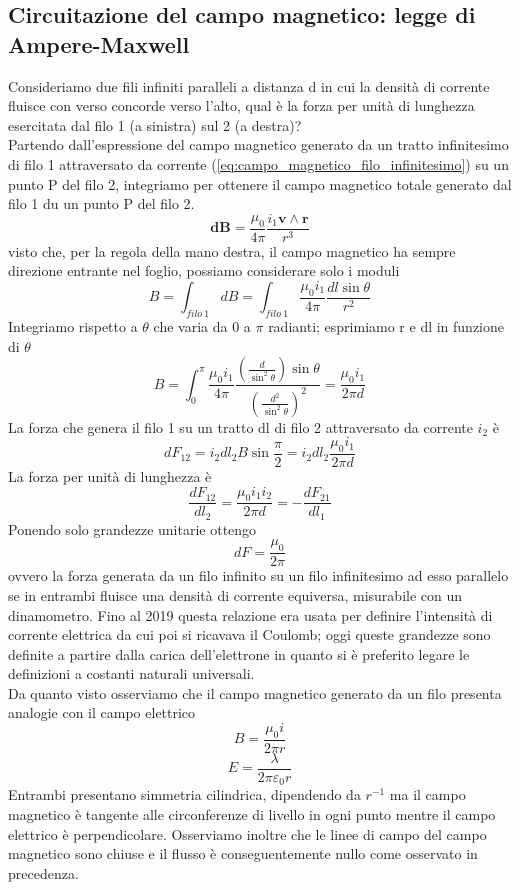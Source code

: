 \documentclass[
10pt, %
a4paper, %
oneside, %
headinclude,footinclude, %
BCOR5mm, %
]{scrartcl}
\begin{document}
\subsection{Circuitazione del campo magnetico: legge di Ampere-Maxwell}
Consideriamo due fili infiniti paralleli a distanza d in cui la densità di corrente fluisce con verso concorde verso l'alto, qual è la forza per unità di lunghezza esercitata dal filo 1 (a sinistra) sul 2 (a destra)? \\
Partendo dall'espressione del campo magnetico generato da un tratto infinitesimo di filo 1 attraversato da corrente (\ref{eq:campo_magnetico_filo_infinitesimo}) su un punto P del filo 2, integriamo per ottenere il campo magnetico totale generato dal filo 1 du un punto P del filo 2. 
\[\mathbf{dB} = \frac{\mu_0}{4\pi}\frac{i_1\mathbf{v}\wedge\mathbf{r}}{r^3} \]
visto che, per la regola della mano destra, il campo magnetico ha sempre direzione entrante nel foglio, possiamo considerare solo i moduli
\[B=\int_{filo\ 1}dB= \int_{filo\ 1}\frac{\mu_0 i_1 }{4\pi}\frac{dl \sin\theta}{r^2}\]
Integriamo rispetto a $\theta$ che varia da 0 a $\pi$ radianti; esprimiamo r e dl in funzione di $\theta$
\[B = \int_{0}^{\pi}\frac{\mu_0 i_1 }{4\pi}\frac{\left(\frac{d}{\sin^2\theta}\right) \sin\theta}{\left(\frac{d^2}{\sin^2\theta}\right)^2}= \frac{\mu_0 i_1}{2\pi d}\]
La forza che genera il filo 1 su un tratto dl di filo 2 attraversato da corrente \(i_2\) è 
\[dF_{12} = i_2dl_2 B\sin\frac{\pi}{2}=i_2dl_2 \frac{\mu_0 i_1}{2\pi d}\]
La forza per unità di lunghezza è 
\[\frac{dF_{12}}{dl_2}= \frac{\mu_0 i_1i_2}{2\pi d}=-\frac{dF_{21}}{dl_1}\]
Ponendo solo grandezze unitarie ottengo
\[dF = \frac{\mu_0}{2\pi}\]
ovvero la forza generata da un filo infinito su un filo infinitesimo ad esso parallelo se in entrambi fluisce una densità di corrente equiversa, misurabile con un dinamometro. Fino al 2019 questa relazione era usata per definire l'intensità di corrente elettrica da cui poi si ricavava il Coulomb; oggi queste grandezze sono definite a partire dalla carica dell'elettrone in quanto si è preferito legare le definizioni a costanti naturali universali.\\
Da quanto visto osserviamo che il campo magnetico generato da un filo presenta analogie con il campo elettrico
\[B = \frac{\mu_0 i}{2\pi r}\]
\[E = \frac{\lambda}{2\pi \varepsilon_0 r}\]
Entrambi presentano simmetria cilindrica, dipendendo da \(r^{-1}\) ma il campo magnetico è tangente alle circonferenze di livello in ogni punto mentre il campo elettrico è perpendicolare. Osserviamo inoltre che le linee di campo del campo magnetico sono chiuse e il flusso è conseguentemente nullo come osservato in precedenza. 
\end{document}
